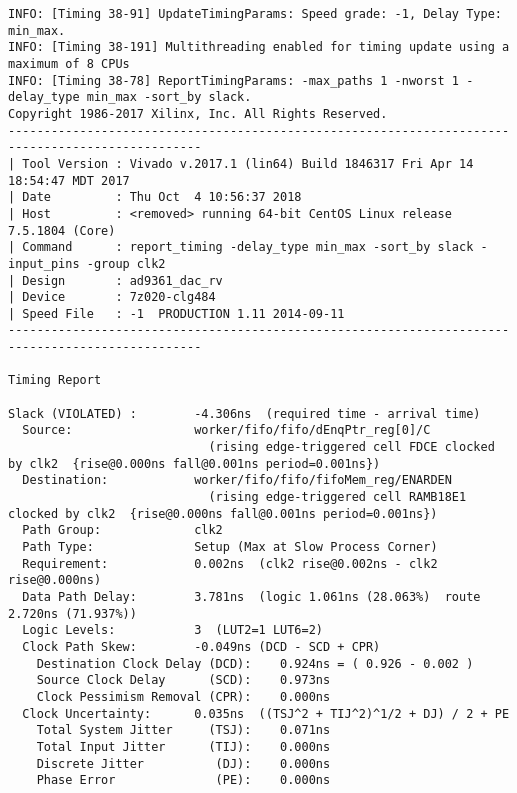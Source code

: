 \documentclass{article}
\begin{document}
\begin{lstlisting}
INFO: [Timing 38-91] UpdateTimingParams: Speed grade: -1, Delay Type: min_max.
INFO: [Timing 38-191] Multithreading enabled for timing update using a maximum of 8 CPUs
INFO: [Timing 38-78] ReportTimingParams: -max_paths 1 -nworst 1 -delay_type min_max -sort_by slack.
Copyright 1986-2017 Xilinx, Inc. All Rights Reserved.
-------------------------------------------------------------------------------------------------
| Tool Version : Vivado v.2017.1 (lin64) Build 1846317 Fri Apr 14 18:54:47 MDT 2017
| Date         : Thu Oct  4 10:56:37 2018
| Host         : <removed> running 64-bit CentOS Linux release 7.5.1804 (Core)
| Command      : report_timing -delay_type min_max -sort_by slack -input_pins -group clk2
| Design       : ad9361_dac_rv
| Device       : 7z020-clg484
| Speed File   : -1  PRODUCTION 1.11 2014-09-11
-------------------------------------------------------------------------------------------------

Timing Report

Slack (VIOLATED) :        -4.306ns  (required time - arrival time)
  Source:                 worker/fifo/fifo/dEnqPtr_reg[0]/C
                            (rising edge-triggered cell FDCE clocked by clk2  {rise@0.000ns fall@0.001ns period=0.001ns})
  Destination:            worker/fifo/fifo/fifoMem_reg/ENARDEN
                            (rising edge-triggered cell RAMB18E1 clocked by clk2  {rise@0.000ns fall@0.001ns period=0.001ns})
  Path Group:             clk2
  Path Type:              Setup (Max at Slow Process Corner)
  Requirement:            0.002ns  (clk2 rise@0.002ns - clk2 rise@0.000ns)
  Data Path Delay:        3.781ns  (logic 1.061ns (28.063%)  route 2.720ns (71.937%))
  Logic Levels:           3  (LUT2=1 LUT6=2)
  Clock Path Skew:        -0.049ns (DCD - SCD + CPR)
    Destination Clock Delay (DCD):    0.924ns = ( 0.926 - 0.002 )
    Source Clock Delay      (SCD):    0.973ns
    Clock Pessimism Removal (CPR):    0.000ns
  Clock Uncertainty:      0.035ns  ((TSJ^2 + TIJ^2)^1/2 + DJ) / 2 + PE
    Total System Jitter     (TSJ):    0.071ns
    Total Input Jitter      (TIJ):    0.000ns
    Discrete Jitter          (DJ):    0.000ns
    Phase Error              (PE):    0.000ns


\end{lstlisting}
\end{document}

